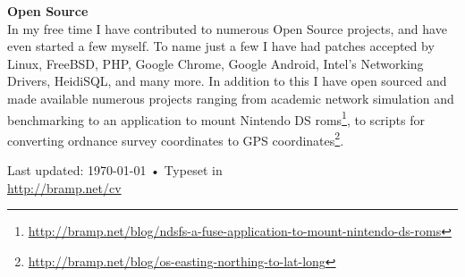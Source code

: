 \documentclass[a4paper,10pt]{article}
\begin{document}
\textbf{Open Source}\\
 In my free time I have contributed to numerous Open Source projects, and have even started a few myself. To name just a few I have had patches accepted by Linux, FreeBSD, PHP, Google Chrome, Google Android, Intel's Networking Drivers, HeidiSQL, and many more. In addition to this I have open sourced and made available numerous projects ranging from academic network simulation and benchmarking to an application to mount Nintendo DS roms\footnote{\href{http://bramp.net/blog/ndsfs-a-fuse-application-to-mount-nintendo-ds-roms}{http://bramp.net/blog/ndsfs-a-fuse-application-to-mount-nintendo-ds-roms}}, to scripts for converting ordnance survey coordinates to GPS coordinates\footnote{\href{http://bramp.net/blog/os-easting-northing-to-lat-long}{http://bramp.net/blog/os-easting-northing-to-lat-long}}.




\newpage
\renewcommand\refname{Publications}


\vfill{}

\begin{center}
{\scriptsize  Last updated: \today\- •\- 
Typeset in \XeLaTeX\\
\href{http://bramp.net/cv}{http://bramp.net/cv}}
\end{center}
\end{document}

